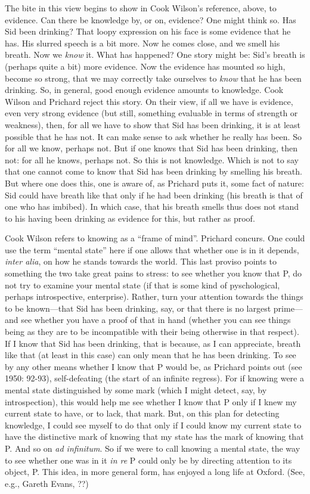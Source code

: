 The bite in this view begins to show in Cook Wilson's reference, above, to evidence. Can there be knowledge by, or on, evidence? One might think so. Has Sid been drinking? That loopy expression on his face is some evidence that he has. His slurred speech is a bit more. Now he comes close, and we smell his breath. Now we \emph{know} it. What has happened? One story might be: Sid's breath is (perhaps quite a bit) more evidence. Now the evidence has mounted so high, become so strong, that we may correctly take ourselves to \emph{know} that he has been drinking. So, in general, good enough evidence amounts to knowledge. Cook Wilson and Prichard reject this story. On their view, if all we have is evidence, even very strong evidence (but still, something evaluable in terms of strength or weakness), then, for all we have to show that Sid has been drinking, it is at least possible that he has not. It can make sense to ask whether he really has been.  So for all we know, perhaps not. But if one knows that Sid has been drinking, then not: for all he knows, perhaps not. So this is not knowledge. Which is not to say that one cannot come to know that Sid has been drinking by smelling his breath. But where one does this, one is aware of, as Prichard puts it, some fact of nature: Sid could have breath like that only if he had been drinking (his breath is that of one who has imbibed). In which case, that his breath smells thus does not stand to his having been drinking as evidence for this, but rather as proof.

Cook Wilson refers to knowing as a ``frame of mind''. Prichard concurs. One could use the term ``mental state'' here if one allows that whether one is in it depends, \emph{inter alia}, on how he stands towards the world. This last proviso points to something the two take great pains to stress: to see whether you know that P, do not try to examine your mental state (if that is some kind of pyschological, perhaps introspective, enterprise). Rather, turn your attention towards the things to be known---that Sid has been drinking, say, or that there is no largest prime---and see whether you have a proof of that in hand (whether you can see things being as they are to be incompatible with their being otherwise in that respect). If I know that Sid has been drinking, that is because, as I can appreciate, breath like that (at least in this case) can only mean that he has been drinking. To see by any other means whether I know that P would be, as Prichard points out (see 1950: 92-93), self-defeating (the start of an infinite regress). For if knowing were a mental state distinguished by some mark (which I might detect, say, by introspection), this would help me see whether I know that P only if I knew my current state to have, or to lack, that mark. But, on this plan for detecting knowledge, I could see myself to do that only if I could know my current state to have the distinctive mark of knowing that my state has the mark of knowing that P. And so on \emph{ad infinitum}. So if we were to call knowing a mental state, the way to see whether one was in it \emph{in re} P could only be by directing attention to its object, P. This idea, in more general form, has enjoyed a long life at Oxford. (See, e.g., Gareth Evans, ??)

